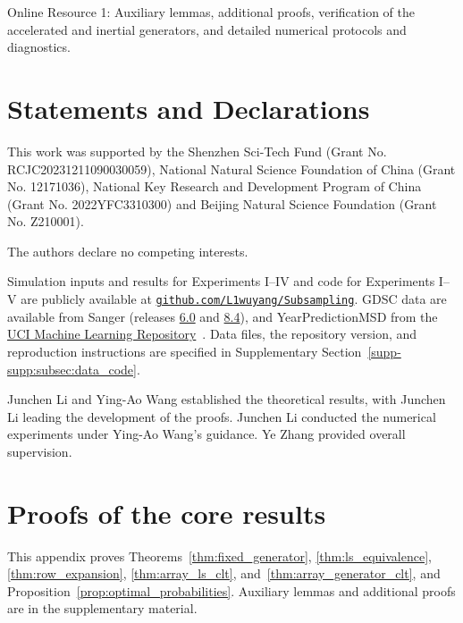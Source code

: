 \documentclass[pdflatex,iicol,sn-mathphys-ay]{sn-jnl}
\theoremstyle{thmstyleone}
\theoremstyle{thmstylethree}
\theoremstyle{thmstyletwo}
\begin{document}
\backmatter

Online Resource 1: Auxiliary lemmas, additional proofs, verification of the
accelerated and inertial generators, and detailed numerical protocols and diagnostics.

\section*{Statements and Declarations}

This work was supported by the Shenzhen Sci-Tech Fund (Grant No. RCJC20231211090030059), National Natural Science Foundation of China (Grant No. 12171036), National Key Research and Development Program of China (Grant No. 2022YFC3310300) and Beijing Natural Science Foundation (Grant No. Z210001).

The authors declare no competing interests.

Simulation inputs and results for Experiments I--IV and code for Experiments
I--V are publicly available at \href{https://github.com/L1wuyang/Subsampling}{\nolinkurl{github.com/L1wuyang/Subsampling}}.
GDSC data are available from Sanger (releases
\href{https://ftp.sanger.ac.uk/pub/project/cancerrxgene/releases/release-6.0/}{6.0}
and \href{https://ftp.sanger.ac.uk/pub/project/cancerrxgene/releases/release-8.4/}{8.4}),
and YearPredictionMSD from the
\href{https://doi.org/10.24432/C50K61}{UCI Machine Learning Repository}~\citep{bertin2011year}.
Data files, the repository version, and reproduction instructions are
specified in Supplementary Section~\ref{supp-supp:subsec:data_code}.

Junchen Li and Ying-Ao Wang established the theoretical results, with Junchen Li
leading the development of the proofs. Junchen Li conducted the numerical experiments
under Ying-Ao Wang's guidance. Ye Zhang provided overall supervision.

\appendix
{}
\section{Proofs of the core results}
\label{app:core-proofs}

This appendix proves Theorems~\ref{thm:fixed_generator},
\ref{thm:ls_equivalence}, \ref{thm:row_expansion},
\ref{thm:array_ls_clt}, and~\ref{thm:array_generator_clt}, and
Proposition~\ref{prop:optimal_probabilities}.
Auxiliary lemmas and additional proofs are in the supplementary material.
\end{document}

